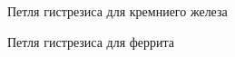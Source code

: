 \documentclass[11pt]{article}
\begin{document}
\begin{enumerate}
\begin{figure}[H]
\caption{Петля гистрезиса для кремниего железа}
\label{pic:3}
\end{figure}

\begin{figure}[H]
\caption{Петля гистрезиса для феррита}
\label{pic:3}
\end{figure}


\end{enumerate}
\end{document}
